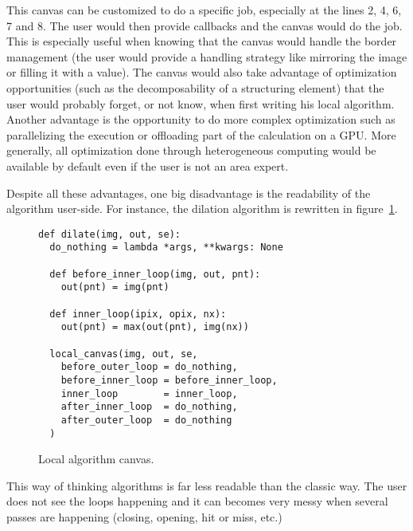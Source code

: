 This canvas can be customized to do a specific job, especially at the lines 2, 4, 6, 7 and 8. The user would then
provide callbacks and the canvas would do the job. This is especially useful when knowing that the canvas would handle
the border management (the user would provide a handling strategy like mirroring the image or filling it with a value).
The canvas would also take advantage of optimization opportunities (such as the decomposability of a structuring
element) that the user would probably forget, or not know, when first writing his local algorithm. Another advantage is
the opportunity to do more complex optimization such as parallelizing the execution or offloading part of the
calculation on a GPU. More generally, all optimization done through heterogeneous computing would be available by
default even if the user is not an area expert.

Despite all these advantages, one big disadvantage is the readability of the algorithm user-side. For instance, the
dilation algorithm is rewritten in figure~\ref{fig.local.algorithm.dilate}.

\begin{figure}[tbh]
  \centering
  \begin{verbatim}
def dilate(img, out, se):
  do_nothing = lambda *args, **kwargs: None

  def before_inner_loop(img, out, pnt):
    out(pnt) = img(pnt)
  
  def inner_loop(ipix, opix, nx):
    out(pnt) = max(out(pnt), img(nx))

  local_canvas(img, out, se,
    before_outer_loop = do_nothing,
    before_inner_loop = before_inner_loop,
    inner_loop        = inner_loop,
    after_inner_loop  = do_nothing,
    after_outer_loop  = do_nothing
  )
  \end{verbatim}

  \caption{Local algorithm canvas.}
  \label{fig.local.algorithm.dilate}
\end{figure}

This way of thinking algorithms is far less readable than the classic way. The user does not see the loops happening and
it can becomes very messy when several passes are happening (closing, opening, hit or miss, etc.)

\clearpage

